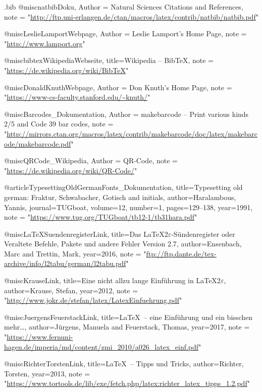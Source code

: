 \documentclass[a4paper,10pt,twoside]{scrbook}
\begin{document}
\begin{filecontents*}{\jobname.bib}
@misc{natbibDoku,
	Author = {{Natural Sciences Citations and References}},
	note = "\url{http://ftp.uni-erlangen.de/ctan/macros/latex/contrib/natbib/natbib.pdf}"
}

@misc{LeslieLamportWebpage,
        Author = {{Leslie Lamport's Home Page}},
        note = "\url{http://www.lamport.org}"
}


@misc{bibtexWikipediaWebseite,
	title={{Wikipedia -- BibTeX}},
	note = "\url{https://de.wikipedia.org/wiki/BibTeX}"
}

@misc{DonaldKnuthWebpage,
        Author = {{Don Knuth's Home Page}},
        note = "\url{https://www-cs-faculty.stanford.edu/~knuth/}"
}

@misc{Barcodes_Dokumentation,
        Author = {{makebarcode – Print various kinds 2/5 and Code 39 bar codes}},
        note = "\url{http://mirrors.ctan.org/macros/latex/contrib/makebarcode/doc/latex/makebarcode/makebarcode.pdf}"
}


@misc{QRCode_Wikipedia,
        Author = {{QR-Code}},
        note = "\url{https://de.wikipedia.org/wiki/QR-Code/}"
}

@article{TypesettingOldGermanFonts_Dokumentation,
    title={Typesetting old german: Fraktur, Schwabacher, Gotisch and initials},
    author={Haralambous, Yannis},
    journal={TUGboat},
    volume={12},
    number={1},
    pages={129--138},
    year={1991},
    note = "\url{https://www.tug.org/TUGboat/tb12-1/tb31hara.pdf}"
}


@misc{LaTeXSuendenregisterLink,
  	title={{Das \LaTeX 2$\varepsilon$-S{\"u}ndenregister oder Veraltete Befehle, Pakete und andere Fehler Version 2.7}},
  	author={Ensenbach, Marc and Trettin, Mark},
  	year={2016},
  	note = "\url{ftp://ftp.dante.de/tex-archive/info/l2tabu/german/l2tabu.pdf}"
}

@misc{KrauseLink,
	title={{Eine nicht allzu lange Einführung in \LaTeX 2$\varepsilon$}},
	author={Krause, Stefan},
	year={2012},
	note = "\url{http://www.jokr.de/stefan/latex/LatexEinfuehrung.pdf}"
}

@misc{JuergensFeuerstackLink,
	title={{\LaTeX\ -- eine Einführung und ein bisschen mehr\dots}},
	author={Jürgens, Manuela and Feuerstack, Thomas},
	year={2017},
	note = "\url{https://www.fernuni-hagen.de/imperia/md/content/zmi_2010/a026_latex_einf.pdf}"
}


@misc{RichterTorstenLink,
	title={{\LaTeX\ -- Tipps und Tricks}},
	author={Richter, Torsten},
	year={2013},
	note = "\url{https://www.tortools.de/lib/exe/fetch.php/latex:richter_latex_tipps_1.2.pdf}"
}




\end{filecontents*}
\end{document}
